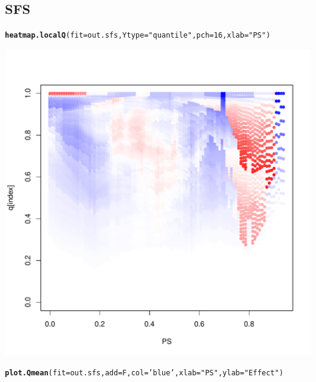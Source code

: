 \documentclass{article}\usepackage[]{graphicx}\usepackage[]{color}
\makeatletter
\def\maxwidth{ %
  \ifdim\Gin@nat@width>\linewidth
    \linewidth
  \else
    \Gin@nat@width
  \fi
}
\newcommand{\hlnum}[1]{\textcolor[rgb]{0.686,0.059,0.569}{#1}}%
\newcommand{\hlstr}[1]{\textcolor[rgb]{0.192,0.494,0.8}{#1}}%
\newcommand{\hlstd}[1]{\textcolor[rgb]{0.345,0.345,0.345}{#1}}%
\newcommand{\hlkwc}[1]{\textcolor[rgb]{0.333,0.667,0.333}{#1}}%
\newcommand{\hlkwd}[1]{\textcolor[rgb]{0.737,0.353,0.396}{\textbf{#1}}}%
\newenvironment{kframe}{%
 \def\at@end@of@kframe{}%
 \ifinner\ifhmode%
  \def\at@end@of@kframe{\end{minipage}}%
  \begin{minipage}{\columnwidth}%
 \fi\fi%
 \def\FrameCommand##1{\hskip\@totalleftmargin \hskip-\fboxsep
 \colorbox{shadecolor}{##1}\hskip-\fboxsep
     \hskip-\linewidth \hskip-\@totalleftmargin \hskip\columnwidth}%
 \MakeFramed {\advance\hsize-\width
   \@totalleftmargin\z@ \linewidth\hsize
   \@setminipage}}%
 {\par\unskip\endMakeFramed%
 \at@end@of@kframe}
\newenvironment{knitrout}{}{} %
\makeatother
\begin{document}
\subsection{SFS}
\begin{knitrout}
\color{fgcolor}\begin{kframe}
\begin{alltt}
\hlkwd{heatmap.localQ}\hlstd{(}\hlkwc{fit}\hlstd{=out.sfs ,} \hlkwc{Ytype}\hlstd{=}\hlstr{"quantile"} \hlstd{,} \hlkwc{pch}\hlstd{=}\hlnum{16} \hlstd{,} \hlkwc{xlab}\hlstd{=}\hlstr{"PS"}\hlstd{)}
\end{alltt}
\end{kframe}

{\centering \includegraphics[width=\maxwidth]{figures/SFS-heatmap-1} 

}


\begin{kframe}\begin{alltt}
\hlkwd{plot.Qmean}\hlstd{(}\hlkwc{fit}\hlstd{=out.sfs ,} \hlkwc{add}\hlstd{=F ,} \hlkwc{col}\hlstd{=}\hlstr{'blue'} \hlstd{,} \hlkwc{xlab}\hlstd{=}\hlstr{"PS"} \hlstd{,} \hlkwc{ylab}\hlstd{=}\hlstr{"Effect"}\hlstd{)}
\end{alltt}
\end{kframe}


\end{knitrout}
\end{document}
